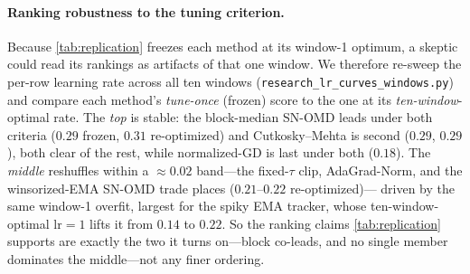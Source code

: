 \documentclass{article}
\begin{document}
\paragraph{Ranking robustness to the tuning criterion.} Because \cref{tab:replication} freezes
each method at its window-1 optimum, a skeptic could read its rankings as artifacts of that one
window. We therefore re-sweep the per-row learning rate across all ten windows
(\texttt{research\_lr\_curves\_windows.py}) and compare each method's \emph{tune-once} (frozen)
score to the one at its \emph{ten-window}-optimal rate. The \emph{top} is stable: the
block-median SN-OMD leads under both criteria ($0.29$ frozen, $0.31$ re-optimized) and
Cutkosky--Mehta is second ($0.29$, $0.29$), both clear of the rest, while normalized-GD is last
under both ($0.18$). The \emph{middle} reshuffles within a ${\approx}0.02$ band---the fixed-$\tau$
clip, AdaGrad-Norm, and the winsorized-EMA SN-OMD trade places ($0.21$--$0.22$ re-optimized)---%
driven by the same window-1 overfit, largest for the spiky EMA tracker, whose ten-window-optimal
$\mathrm{lr}{=}1$ lifts it from $0.14$ to $0.22$. So the ranking claims \cref{tab:replication}
supports are exactly the two it turns on---block co-leads, and no single member dominates the
middle---not any finer ordering.
\end{document}

